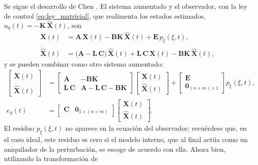 Se sigue el desarrollo de Chen
\cite[sec.~8.5]{chen1999linear}. El sistema aumentado y el observador, con la
ley de control \eqref{eq:ley_matricial}, que realimenta los estados estimados,
$u_0(t) = -\mathbf{K}\,\widehat{\mathbf{X}}(t)$, son
\begin{equation}
\begin{aligned}
\dot{\mathbf{X}}(t) &= \mathbf{A}\,\mathbf{X}(t) - \mathbf{B}\mathbf{K}\,\widehat{\mathbf{X}}(t) + \mathbf{E}\,p_{\xi}(\xi,t), \\
\dot{\widehat{\mathbf{X}}}(t) &= \bigl(\mathbf{A} - \mathbf{L}\,\mathbf{C}\bigr)\,\widehat{\mathbf{X}}(t)
+ \mathbf{L}\,\mathbf{C}\,\mathbf{X}(t) - \mathbf{B}\mathbf{K}\,\widehat{\mathbf{X}}(t),
\end{aligned}
\end{equation}
y se pueden combinar como otro sistema aumentado:
\begin{equation}
\begin{aligned}
\begin{bmatrix} \dot{\mathbf{X}}(t) \\ \dot{\widehat{\mathbf{X}}}(t) \end{bmatrix}
&=
\begin{bmatrix} \mathbf{A} & -\mathbf{B}\mathbf{K} \\ \mathbf{L}\,\mathbf{C} & \mathbf{A} - \mathbf{L}\,\mathbf{C} - \mathbf{B}\mathbf{K} \end{bmatrix}
\begin{bmatrix} \mathbf{X}(t) \\ \widehat{\mathbf{X}}(t) \end{bmatrix}
+
\begin{bmatrix} \mathbf{E} \\ \mathbf{0}_{(n+m)\times 1} \end{bmatrix} p_{\xi}(\xi,t), \\
e_y(t) &= \begin{bmatrix} \mathbf{C} & \mathbf{0}_{1\times(n+m)} \end{bmatrix}
\begin{bmatrix} \mathbf{X}(t) \\ \widehat{\mathbf{X}}(t) \end{bmatrix}.
\end{aligned}
\end{equation}
El residuo $p_{\xi}(\xi,t)$ no aparece en la ecuación del observador; recuérdese que, en el caso
ideal, este residuo es cero si el modelo interno, que al final actúa como un aniquilador de la
perturbación, se escoge de acuerdo con ella. Ahora bien, utilizando la transformación de
